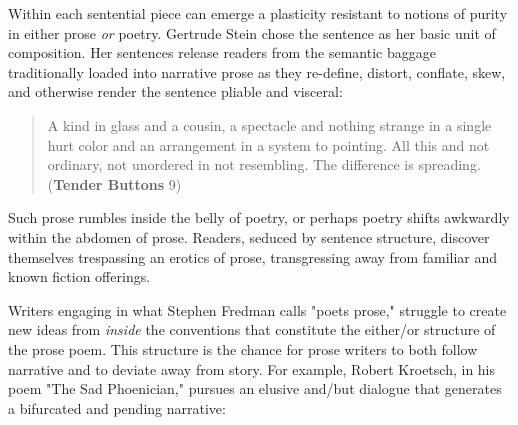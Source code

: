 Within each sentential piece can emerge a plasticity resistant to
notions of purity in either prose \emph{or} poetry. Gertrude Stein chose
the sentence as her basic unit of composition. Her sentences release
readers from the semantic baggage traditionally loaded into narrative
prose as they re-define, distort, conflate, skew, and otherwise render
the sentence pliable and visceral:

\begin{quote}
A kind in glass and a cousin, a spectacle and nothing strange in a
single hurt color and an arrangement in a system to pointing. All this
and not ordinary, not unordered in not resembling. The difference is
spreading. (\textbf{Tender Buttons} 9)
\end{quote}

Such prose rumbles inside the belly of poetry, or perhaps poetry shifts
awkwardly within the abdomen of prose. Readers, seduced by sentence
structure, discover themselves trespassing an erotics of prose,
transgressing away from familiar and known fiction offerings.

Writers engaging in what Stephen Fredman calls "poets prose," struggle
to create new ideas from \emph{inside} the conventions that constitute
the either/or structure of the prose poem. This structure is the chance
for prose writers to both follow narrative and to deviate away from
story. For example, Robert Kroetsch, in his poem "The Sad Phoenician,"
pursues an elusive and/but dialogue that generates a bifurcated and
pending narrative:

